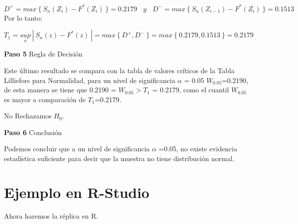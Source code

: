 \documentclass[
  a4paper,
  oneside,
  openany]{book}
\begin{document}
\[ D^+= max\ \{\ S_{n}(Z_{i})-F^*(Z_{i}) \ \}= 0.2179 \ \ \ \ y\ \ \ \ D^-= max\ \{ \ S_{n}(Z_{i-1})-F^*(Z_{i}) \ \}=0.1513 \]
Por lo tanto:

\[T_{1}=\underset{x}{sup}\ | \ S_{n}(z)-F^*(z) \ |=max \ \{\ D^+,D^- \ \}=max \ \{ \  0.2179,0.1513 \ \}=0.2179 \]

\textbf{Paso 5} Regla de Decisión

Este último resultado se compara con la tabla de valores críticos de la Tabla Lilliefors para Normalidad, para un nivel de significancia \(\alpha\) = 0.05 \(W_{0.05}\)=0.2190, de esta manera se tiene que 0.2190 = \(W_{0.05} > T_{1}\) = 0.2179, como el cuantil \(W_{0.05}\) es mayor a comparación de \(T_{1}\)=0.2179.

No Rechazamos \(H_0\).

\textbf{Paso 6} Conclusión

Podemos concluir que a un nivel de significancia \(\alpha\) =0.05, no existe evidencia estadística suficiente para decir que la muestra no tiene distribución normal.

\hypertarget{ejemplo-en-r-studio-15}{%
\section{Ejemplo en R-Studio}\label{ejemplo-en-r-studio-15}}

Ahora haremos la réplica en R.
\end{document}
